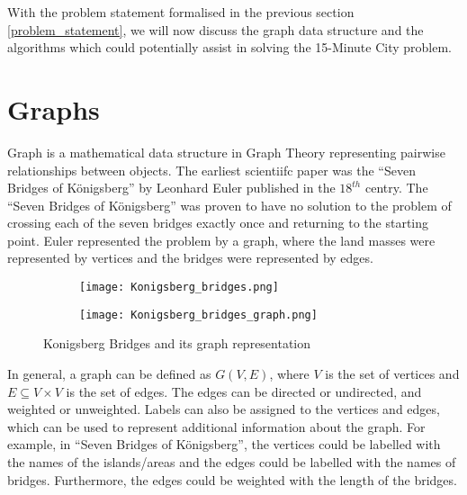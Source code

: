 With the problem statement formalised in the previous section \ref{problem_statement}, we will now discuss the graph data structure and the algorithms which could potentially assist in solving the 15-Minute City problem.

\section{Graphs}

Graph is a mathematical data structure in Graph Theory representing pairwise relationships between objects. The earliest scientiifc paper was the ``Seven Bridges of Königsberg'' by Leonhard Euler published in the $18^{th}$ centry. The ``Seven Bridges of Königsberg'' was proven to have no solution to the problem of crossing each of the seven bridges exactly once and returning to the starting point. Euler represented the problem by a graph, where the land masses were represented by vertices and the bridges were represented by edges.


\begin{figure}[htbp]
    \centering
    \begin{subfigure}[c]{0.6\textwidth}
        \texttt{[image: Konigsberg\_bridges.png]}
    \end{subfigure}\hfill
    \begin{subfigure}[c]{0.4\textwidth}
        \texttt{[image: Konigsberg\_bridges\_graph.png]}
    \end{subfigure} \hfill
    \caption{Konigsberg Bridges and its graph representation}
    \label{fig:konigsberg_bridges}
\end{figure}

In general, a graph can be defined as $G(V,E)$, where $V$ is the set of vertices and $E\subseteq V\times V$ is the set of edges. The edges can be directed or undirected, and weighted or unweighted. Labels can also be assigned to the vertices and edges, which can be used to represent additional information about the graph. For example, in ``Seven Bridges of Königsberg'', the vertices could be labelled with the names of the islands/areas and the edges could be labelled with the names of bridges. Furthermore, the edges could be weighted with the length of the bridges.

